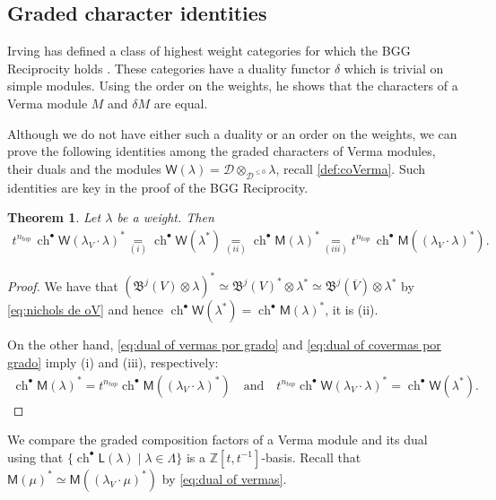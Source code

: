 \documentclass[reqno]{amsart}
\newcommand{\oV}{\overline{V}}
\renewcommand{\_}[1]{_{\left( #1 \right)}}
\renewcommand{\^}[1]{^{\left( #1 \right)}}
\newcommand{\ot}{{\otimes}}
\newcommand\fL{\mathsf{L}}
\newcommand\fM{\mathsf{M}}
\newcommand\fW{\mathsf{W}}
\newcommand{\Z}{{\mathbb Z}}
\newcommand{\D}{\mathcal{D}}
\newcommand{\BV}{{\mathfrak B}}
\newcommand{\chgr}{\operatorname{ch}^{\bullet}}
\theoremstyle{plain}
\newtheorem{theorem}[lema]{Theorem}
\theoremstyle{definition}
\theoremstyle{remark}
\begin{document}
\subsection{Graded character identities}
Irving has defined a class of highest weight categories for which the BGG Reciprocity holds \cite{MR1080852}. These categories have a duality functor $\delta$ which is trivial on simple modules. Using the order on the weights, he shows that the characters of a Verma module $M$ and $\delta M$ are equal.

Although we do not have either such a duality or an order on the weights, we can prove the following identities among the graded characters of Verma modules, their duals and the modules $\fW(\lambda)=\D\ot_{\D^{\leq0}}\lambda$, recall \eqref{def:coVerma}. Such identities are key in the proof of the BGG Reciprocity.

\begin{theorem}\label{teo:chgr de fM y fW}
Let $\lambda$ be a weight. Then
\begin{align*}
t^{n_{top}}\,\chgr\fW(\lambda_V\cdot\lambda)^*\underset{(i)}{=}
\chgr\fW(\lambda^*)\underset{(ii)}{=}
\chgr\fM(\lambda)^*\underset{(iii)}{=}
t^{n_{top}}\,\chgr\fM\left((\lambda_V\cdot\lambda)^*\right).
\end{align*}
\end{theorem}

\begin{proof}
We have that $\left(\BV^{j}(V)\ot\lambda\right)^*\simeq\BV^{j}(V)^*\ot\lambda^*\simeq\BV^{j}(\oV)\ot\lambda^*$ 
by \eqref{eq:nichols de oV} and hence $\chgr\fW(\lambda^*)=\chgr\fM(\lambda)^*$, it is (ii). 

On the other hand, \eqref{eq:dual of vermas por grado} and \eqref{eq:dual of covermas por grado} imply  (i) and (iii), respectively:
\begin{align*}
\chgr\fM(\lambda)^*=t^{n_{top}}\chgr\fM\left((\lambda_V\cdot\lambda)^*\right)\quad\mbox{and}\quad t^{n_{top}}\chgr\fW(\lambda_V\cdot\lambda)^*=\chgr\fW(\lambda^*).
\end{align*}
\end{proof}


We compare the graded composition factors of a Verma module and its dual using that $\{\chgr\fL(\lambda)\mid\lambda\in\Lambda\}$ is a $\Z[t,t^{-1}]$-basis. Recall that $\fM(\mu)^*\simeq\fM\left((\lambda_V\cdot\mu)^*\right)$ by \eqref{eq:dual of vermas}.
\end{document}
